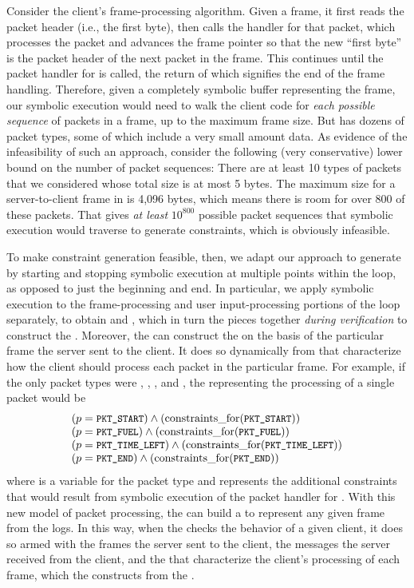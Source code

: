 Consider the client's frame-processing algorithm.  Given a frame, it
first reads the packet header (i.e., the first byte), then calls the
handler for that packet, which processes the packet and advances the
frame pointer so that the new ``first byte'' is the packet header of
the next packet in the frame.  This continues until the packet handler
for \pktend is called, the return of which signifies the end of the
frame handling.  Therefore, given a completely symbolic buffer
representing the frame, our symbolic execution would need to walk the
client code for {\em each possible sequence} of packets in a frame, up
to the maximum frame size.  But \xpilot has dozens of packet types,
some of which include a very small amount data.  As evidence of the
infeasibility of such an approach, consider the following (very
conservative) lower bound on the number of packet sequences: There are
at least 10 types of packets that we considered whose total size is at
most 5 bytes.  The maximum size for a server-to-client frame in
\xpilot is 4,096 bytes, which means there is room for over 800 of
these packets.  That gives {\em at least} $10^{800}$ possible packet
sequences that symbolic execution would traverse to generate
constraints, which is obviously infeasible.

To make \eager constraint generation feasible, then, we adapt our
approach to generate \pathsegcons by starting and stopping symbolic
execution at multiple points within the loop, as opposed to just the
beginning and end.  In particular, we apply symbolic
execution to the frame-processing and user input-processing portions
of the loop separately, to obtain {\em {}} and {\em
  \framecons}, which in turn the \verifier pieces together {\em during
  verification} to construct the \pathsegcons.  Moreover, the
\verifier can construct the \framecons on the basis of the particular
frame the server sent to the client.  It does so dynamically from
\packetcons that characterize how the client should process each
packet in the particular frame.  For example, if the only
packet types were \pktstart, \pktfuel, \pkttimeleft, and \pktend, the
\packetcons representing the processing of a single packet would be
\[\begin{array}{l}
( p = \texttt{\small PKT\_START} ) \wedge (\mathrm{constraints\_for}(\texttt{\small PKT\_START})) \\
( p = \texttt{\small PKT\_FUEL} ) \wedge (\mathrm{constraints\_for}(\texttt{\small PKT\_FUEL})) \\
( p = \texttt{\small PKT\_TIME\_LEFT} ) \wedge (\mathrm{constraints\_for}(\texttt{\small PKT\_TIME\_LEFT})) \\
( p = \texttt{\small PKT\_END} ) \wedge (\mathrm{constraints\_for}(\texttt{\small PKT\_END}))
\end{array}\]
where \packettype is a variable for the packet type and
\constraintsfor{\pktstart} represents the additional constraints that
would result from symbolic execution of the packet handler for
\pktstart.  With this new model of packet processing, the \verifier
can build a \framecon to represent any given frame from the logs.  In
this way, when the \verifier checks the behavior of a given client, it
does so armed with the frames the server sent to the client, the
messages the server
received from the client, and the \framecons that characterize the
client's processing of each frame, which the \verifier constructs from
the \packetcons.

